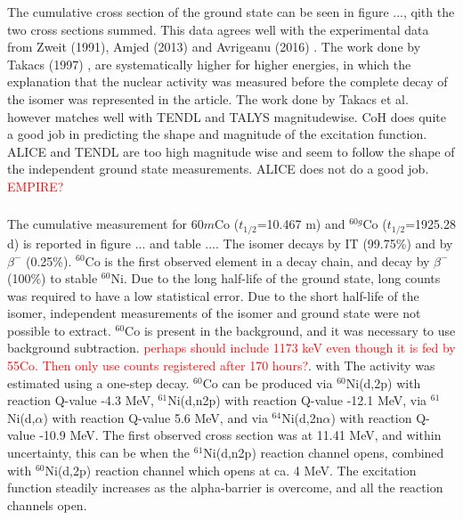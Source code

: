 \noindent The cumulative cross section of the ground state can be seen in figure ..., qith the two cross sections summed. This data agrees well with the experimental data from Zweit (1991), Amjed (2013) and Avrigeanu (2016) \cite{Zweit1991, Avrigeanu2016, Amjed2013}. The work done by Takacs (1997) \cite{Takacs1997}, are systematically higher for higher energies, in which the explanation that the nuclear activity was measured before the complete decay of the isomer was represented in the article. The work done by Takacs et al. however matches well with TENDL and TALYS magnitudewise. CoH does quite a good job in predicting the shape and magnitude of the excitation function. ALICE and TENDL are too high magnitude wise and seem to follow the shape of the independent ground state measurements. ALICE does not do a good job. \textcolor{red}{EMPIRE?}


\subsubsection{}
The cumulative measurement for $60m$Co ($t_{1/2}$=10.467 m) and $^{60g}$Co ($t_{1/2}$=1925.28 d) \cite{Browne2013} is reported in figure ... and table .... The isomer decays by IT (99.75\%) and by $\beta^-$ (0.25\%). $^{60}$Co is the first observed element in a decay chain, and decay by $\beta^-$ (100\%) to stable $^{60}$Ni. Due to the long half-life of the ground state, long counts was required to have a low statistical error. Due to the short half-life of the isomer, independent measurements of the isomer and ground state were not possible to extract. $^{60}$Co is present in the background, and it was necessary to use background subtraction.  
\textcolor{red}{perhaps should include 1173 keV even though it is fed by 55Co. Then only use counts registered after 170 hours?}. with  The activity was estimated using a one-step decay. $^{60}$Co can be produced via $^{60}$Ni(d,2p) with reaction Q-value -4.3 MeV, $^{61}$Ni(d,n2p) with reaction Q-value -12.1 MeV, via $^{61}$Ni(d,$\alpha$) with reaction Q-value 5.6 MeV, and via $^{64}$Ni(d,2n$\alpha$) with reaction Q-value -10.9 MeV. The first observed cross section was at 11.41 MeV, and within uncertainty, this can be when the $^{61}$Ni(d,n2p) reaction channel opens, combined with $^{60}$Ni(d,2p) reaction channel which opens at ca. 4 MeV. The excitation function steadily increases as the alpha-barrier is overcome, and all the reaction channels open. 

